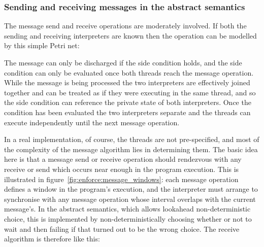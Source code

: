 \subsubsection{Sending and receiving messages in the abstract semantics}

The message send and receive operations are moderately involved.  If
both the sending and receiving interpreters are known then the
operation can be modelled by this simple Petri net:


The message can only be discharged if the side condition holds, and
the side condition can only be evaluated once both threads reach the
message operation.  While the message is being processed the two
interpreters are effectively joined together and can be treated as if
they were executing in the same thread, and so the side condition can
reference the private state of both interpreters.  Once the condition
has been evaluated the two interpreters separate and the threads can
execute independently until the next message operation.

In a real implementation, of course, the threads are not
pre-specified, and most of the complexity of the message algorithm
lies in determining them.  The basic idea here is that a message send
or receive operation should rendezvous with any receive or send which
occurs near enough in the program execution.  This is illustrated in
figure~\ref{fig:enforce:message_windows}: each message operation
defines a window in the program's execution, and the interpreter must
arrange to synchronise with any message operation whose interval
overlaps with the current message's.  In the abstract semantics, which
allows lookahead non-deterministic choice, this is implemented by
non-deterministically choosing whether or not to wait and then failing
if that turned out to be the wrong choice.  The receive algorithm is
therefore like this:

